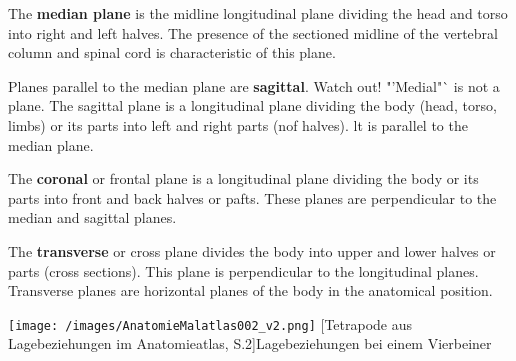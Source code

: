 The \textbf{median plane} is the midline longitudinal plane dividing the head and torso into right and left halves. The presence of the sectioned midline of the vertebral column and spinal cord is characteristic of this plane. 

Planes parallel to the median plane are \textbf{sagittal}. Watch out! "'Medial"` is not a plane. The sagittal plane is a longitudinal plane dividing the body (head, torso, limbs) or its parts into left and right parts (nof halves). lt is parallel to the median plane. 

The \textbf{coronal} or frontal plane is a longitudinal plane dividing the body or its parts into front and back halves or pafts. These planes are perpendicular to the median and sagittal planes. 

The \textbf{transverse} or cross plane divides the body into upper and lower halves or parts (cross sections). This plane is perpendicular to the longitudinal planes. Transverse planes are horizontal planes of the body in the anatomical position.


\begin{minipage}{5cm}\centering
	\texttt{[image: /images/AnatomieMalatlas002\_v2.png]}
	[Tetrapode aus Lagebeziehungen im Anatomieatlas, S.2]{Lagebeziehungen bei einem Vierbeiner}
	\label{fig:Vierbeiner}
\end{minipage}

